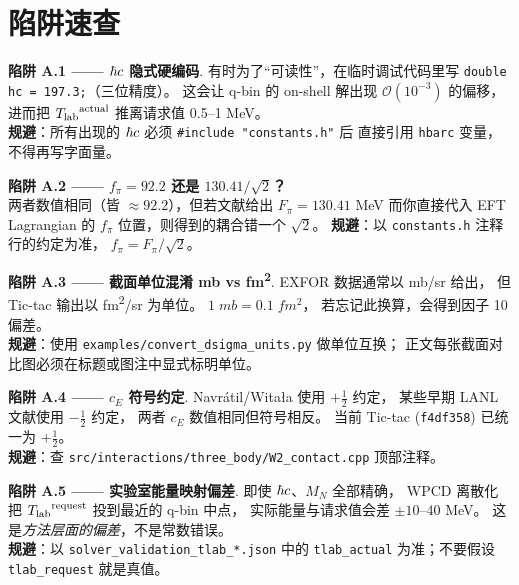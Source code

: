 \section{陷阱速查}
\label{sec:appA_pitfalls}

\begin{pitfallbox}
\textbf{陷阱 A.1 —— $\hbar c$ 隐式硬编码}.
有时为了“可读性”，在临时调试代码里写 \texttt{double hc = 197.3;}（三位精度）。
这会让 q-bin 的 on-shell 解出现 $\mathcal{O}(10^{-3})$ 的偏移，
进而把 ${T_{\text{lab}}}^{\text{actual}}$ 推离请求值 0.5–1 \si{MeV}。\\
\textbf{规避}：所有出现的 $\hbar c$ 必须 \texttt{\#include "constants.h"} 后
直接引用 \texttt{hbarc} 变量，不得再写字面量。
\end{pitfallbox}

\begin{pitfallbox}
\textbf{陷阱 A.2 —— $f_\pi = 92.2$ 还是 $130.41/\sqrt{2}$？}\\
两者数值相同（皆 $\approx 92.2$），但若文献给出 $F_\pi = 130.41$ \si{MeV}
而你直接代入 EFT Lagrangian 的 $f_\pi$ 位置，则得到的耦合错一个 $\sqrt{2}$。
\textbf{规避}：以 \texttt{constants.h} 注释行的约定为准，
$f_\pi = F_\pi/\sqrt{2}$。
\end{pitfallbox}

\begin{pitfallbox}
\textbf{陷阱 A.3 —— 截面单位混淆 \si{mb} vs \si{fm^2}}.
EXFOR 数据通常以 \si{mb/sr} 给出，
但 Tic-tac 输出以 \si{fm^2/sr} 为单位。
$1\;\si{mb} = 0.1\;\si{fm^2}$，
若忘记此换算，会得到因子 10 偏差。\\
\textbf{规避}：使用 \texttt{examples/convert\_dsigma\_units.py} 做单位互换；
正文每张截面对比图必须在标题或图注中显式标明单位。
\end{pitfallbox}

\begin{pitfallbox}
\textbf{陷阱 A.4 —— $c_E$ 符号约定}.
Navrátil/Witała 使用 $+\tfrac{1}{2}$ 约定，
某些早期 LANL 文献使用 $-\tfrac{1}{2}$ 约定，
两者 $c_E$ 数值相同但符号相反。
当前 Tic-tac (\texttt{f4df358}) 已统一为 $+\tfrac{1}{2}$。\\
\textbf{规避}：查 \texttt{src/interactions/three\_body/W2\_contact.cpp} 顶部注释。
\end{pitfallbox}

\begin{pitfallbox}
\textbf{陷阱 A.5 —— 实验室能量映射偏差}.
即使 $\hbar c$、$M_N$ 全部精确，
WPCD 离散化把 ${T_{\text{lab}}}^{\text{request}}$ 投到最近的 q-bin 中点，
实际能量与请求值会差 $\pm 10$–$40$ \si{MeV}。
这是\emph{方法层面的偏差}，不是常数错误。\\
\textbf{规避}：以 \texttt{solver\_validation\_tlab\_*.json} 中的
\texttt{tlab\_actual} 为准；不要假设 \texttt{tlab\_request} 就是真值。
\end{pitfallbox}


